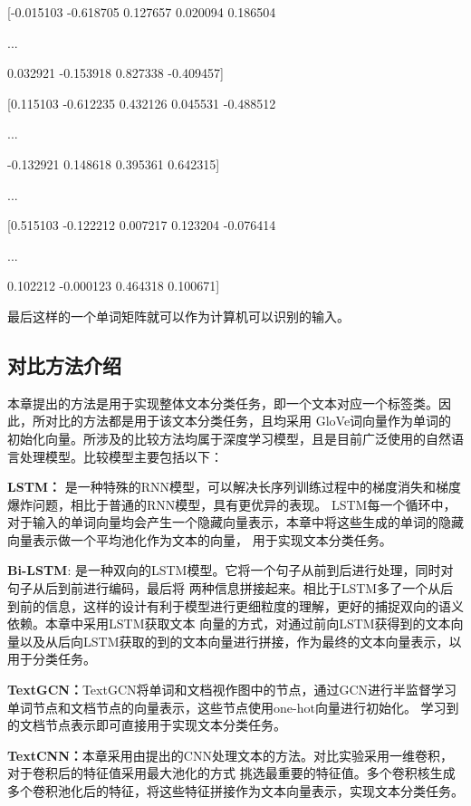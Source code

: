 \centerline{[-0.015103  -0.618705  0.127657  0.020094  0.186504 }

\centerline{...}

\centerline{0.032921  -0.153918  0.827338  -0.409457]}

\centerline{[0.115103  -0.612235  0.432126  0.045531  -0.488512 }

\centerline{...}

\centerline{-0.132921  0.148618  0.395361  0.642315]}

\centerline{...}

\centerline{[0.515103  -0.122212  0.007217  0.123204  -0.076414 }

\centerline{...}

\centerline{0.102212  -0.000123  0.464318  0.100671]}

最后这样的一个单词矩阵就可以作为计算机可以识别的输入。
\subsection{对比方法介绍}
本章提出的方法是用于实现整体文本分类任务，即一个文本对应一个标签类。因此，所对比的方法都是用于该文本分类任务，且均采用
GloVe词向量作为单词的初始化向量。所涉及的比较方法均属于深度学习模型，且是目前广泛使用的自然语言处理模型。比较模型主要包括以下：

\textbf{LSTM：} 是一种特殊的RNN模型，可以解决长序列训练过程中的梯度消失和梯度爆炸问题，相比于普通的RNN模型，具有更优异的表现。
LSTM每一个循环中，对于输入的单词向量均会产生一个隐藏向量表示，本章中将这些生成的单词的隐藏向量表示做一个平均池化作为文本的向量，
用于实现文本分类任务。

\textbf{Bi-LSTM}: 是一种双向的LSTM模型。它将一个句子从前到后进行处理，同时对句子从后到前进行编码，最后将
两种信息拼接起来。相比于LSTM多了一个从后到前的信息，这样的设计有利于模型进行更细粒度的理解，更好的捕捉双向的语义依赖。本章中采用LSTM获取文本
向量的方式，对通过前向LSTM获得到的文本向量以及从后向LSTM获取的到的文本向量进行拼接，作为最终的文本向量表示，以用于分类任务。

\textbf{TextGCN：}TextGCN将单词和文档视作图中的节点，通过GCN进行半监督学习单词节点和文档节点的向量表示，这些节点使用one-hot向量进行初始化。
学习到的文档节点表示即可直接用于实现文本分类任务。

\textbf{TextCNN：}本章采用由提出的CNN处理文本的方法。对比实验采用一维卷积，对于卷积后的特征值采用最大池化的方式
挑选最重要的特征值。多个卷积核生成多个卷积池化后的特征，将这些特征拼接作为文本向量表示，实现文本分类任务。

